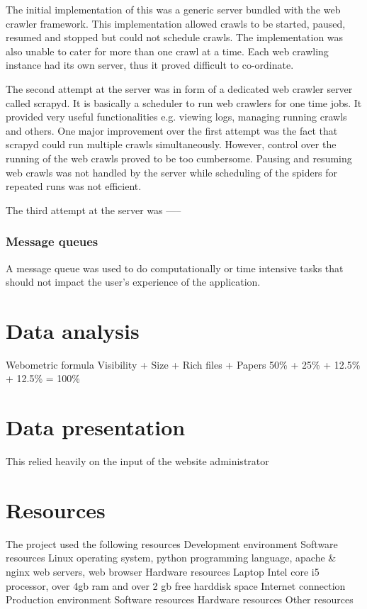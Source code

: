 \noindent
The initial implementation of this was a generic server bundled with the web crawler framework. This implementation allowed crawls to be started, paused, resumed and stopped but could not schedule crawls. The implementation was also unable to cater for more than one crawl at a time. Each web crawling instance had its own server, thus it proved difficult to co-ordinate.

\noindent
The second attempt at the server was in form of a dedicated web crawler server called scrapyd. It is basically a scheduler to run web crawlers for one time jobs. It provided very useful functionalities e.g. viewing logs, managing running crawls and others. One major improvement over the first attempt was the fact that scrapyd could run multiple crawls simultaneously. However, control over the running of the web crawls proved to be too cumbersome. Pausing and resuming web crawls was not handled by the server while scheduling of the spiders for repeated runs was not efficient.

\noindent
The third attempt at the server was -----
\subsubsection{Message queues}
\noindent
A message queue was used to do computationally or time intensive tasks that should not impact the user's experience of the application.

\section{Data analysis}
Webometric formula
Visibility + Size + Rich files + Papers
50\% + 25\% + 12.5\% + 12.5\% = 100\%


\section{Data presentation}
This relied heavily on the input of the website administrator


\section{Resources}
The project used the following resources
Development environment
Software resources
Linux operating system, python programming language, apache \& nginx web servers, web browser
Hardware resources
Laptop Intel core i5 processor, over 4gb ram and over 2 gb free harddisk space
Internet connection
Production environment
Software resources
Hardware resources
Other resources



